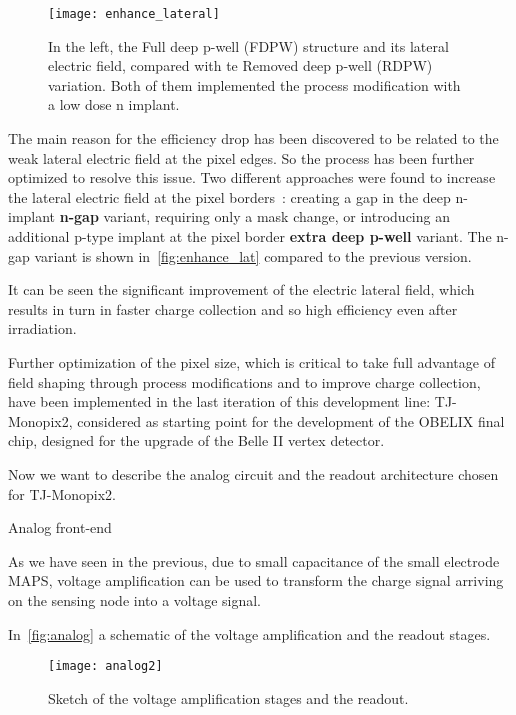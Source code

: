 \begin{figure}[h!]
\centering
\texttt{[image: enhance\_lateral]}
\caption{In the left, the Full deep p-well (FDPW) structure and its lateral electric field, compared with te Removed deep p-well (RDPW) variation. Both of them implemented the process modification with a low dose n implant.}
\label{fig:enhance_lat}
\end{figure}


The main reason for the efficiency drop has been discovered to be related to the weak lateral electric field at the pixel edges. So the process has been further optimized to resolve this issue. Two different approaches were found to increase the lateral electric field at the pixel borders~\cite{Munker_2019}: creating a gap in the deep n-implant \textbf{n-gap} variant, requiring only a mask change, or introducing an additional p-type implant at the pixel border \textbf{extra deep p-well} variant. The n-gap variant is shown in~\autoref{fig:enhance_lat} compared to the previous version.

It can be seen the significant improvement of the electric lateral field, which results in turn in faster charge collection and so high efficiency even after irradiation. 

Further optimization of the pixel size, which is critical to take full advantage of field shaping through process modifications and to improve charge collection, have been implemented in the last iteration of this development line: TJ-Monopix2, considered as starting point for the development of the OBELIX final chip, designed for the upgrade of the Belle II vertex detector.  

Now we want to describe the analog circuit and the readout architecture chosen for TJ-Monopix2. 


\begin{description}
\item[Analog front-end]
\end{description}

As we have seen in the previous, due to small capacitance of the small electrode MAPS, voltage amplification can be used to transform the charge signal arriving on the sensing node into a voltage signal. 

In~\autoref{fig:analog} a schematic of the voltage amplification and the readout stages.

\begin{figure}[h!]
\centering
\texttt{[image: analog2]}
\caption{Sketch of the voltage amplification stages and the readout.}
\label{fig:analog}
\end{figure}

